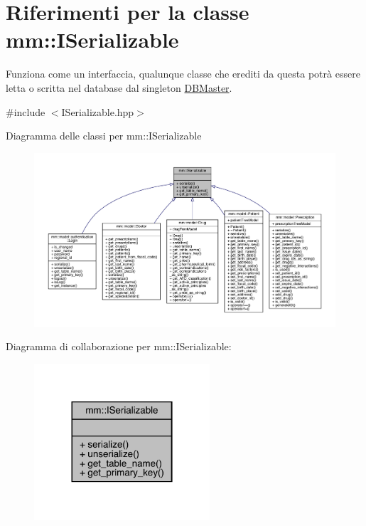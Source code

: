 \hypertarget{classmm_1_1_i_serializable}{}\section{Riferimenti per la classe mm\+:\+:I\+Serializable}
\label{classmm_1_1_i_serializable}


Funziona come un interfaccia, qualunque classe che erediti da questa potrà essere letta o scritta nel database dal singleton \mbox{\hyperlink{classmm_1_1_d_b_master}{D\+B\+Master}}.  




{\ttfamily \#include $<$I\+Serializable.\+hpp$>$}



Diagramma delle classi per mm\+:\+:I\+Serializable
\nopagebreak
\begin{figure}[H]
\begin{center}
\leavevmode
\includegraphics[width=350pt]{d5/d4e/classmm_1_1_i_serializable__inherit__graph}
\end{center}
\end{figure}


Diagramma di collaborazione per mm\+:\+:I\+Serializable\+:
\nopagebreak
\begin{figure}[H]
\begin{center}
\leavevmode
\includegraphics[width=185pt]{db/dc2/classmm_1_1_i_serializable__coll__graph}
\end{center}
\end{figure}
